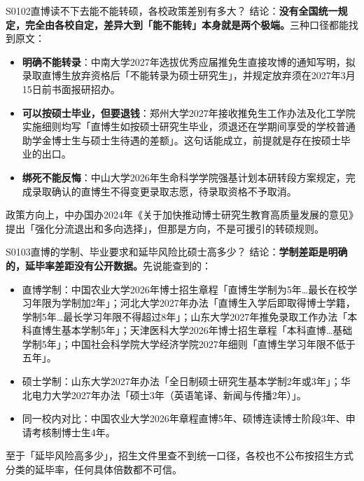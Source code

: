\begin{qa}{S0102}{直博读不下去能不能转硕，各校政策差别有多大？}
结论：\textbf{没有全国统一规定，完全由各校自定，差异大到「能不能转」本身就是两个极端。}三种口径都能找到原文：

\begin{itemize}
  \item \textbf{明确不能转录}：中南大学2027年选拔优秀应届推免生直接攻博的通知写明，拟录取直博生放弃资格后「不能转录为硕士研究生」，并规定放弃须在2027年3月15日前书面报研招办。
  \item \textbf{可以按硕士毕业，但要退钱}：郑州大学2027年接收推免生工作办法及化工学院实施细则均写「直博生如按硕士研究生毕业，须退还在学期间享受的学校普通助学金博士生与硕士生待遇的差额」。这句话能成立，前提就是存在按硕士毕业的出口。
  \item \textbf{绑死不能反悔}：中山大学2026年生命科学学院强基计划本研转段方案规定，完成录取确认的直博生不得变更录取志愿，待录取资格不予取消。
\end{itemize}

政策方向上，中办国办2024年《关于加快推动博士研究生教育高质量发展的意见》提出「强化分流退出和多向选择」，但那是方向，不是可援引的转硕规则。
\end{qa}

\begin{qa}{S0103}{直博的学制、毕业要求和延毕风险比硕士高多少？}
结论：\textbf{学制差距是明确的，延毕率差距没有公开数据。}先说能查到的：

\begin{itemize}
  \item 直博学制：中国农业大学2026年博士招生章程「直博生学制为5年…最长在校学习年限为学制加2年」；河北大学2027年办法「直博生入学后即取得博士学籍，学制5年…最长学习年限不得超过8年」；山东大学2027年推免录取工作办法「本科直博生基本学制5年」；天津医科大学2026年博士招生章程「本科直博…基础学制5年」；中国社会科学院大学经济学院2027年细则「直博生学习年限不低于五年」。
  \item 硕士学制：山东大学2027年办法「全日制硕士研究生基本学制2年或3年」；华北电力大学2027年办法「硕士3年（英语笔译、新闻与传播2年）」。
  \item 同一校内对比：中国农业大学2026年章程直博5年、硕博连读博士阶段3年、申请考核制博士生4年。
\end{itemize}

至于「延毕风险高多少」，招生文件里查不到统一口径，各校也不公布按招生方式分类的延毕率，任何具体倍数都不可信。
\end{qa}

